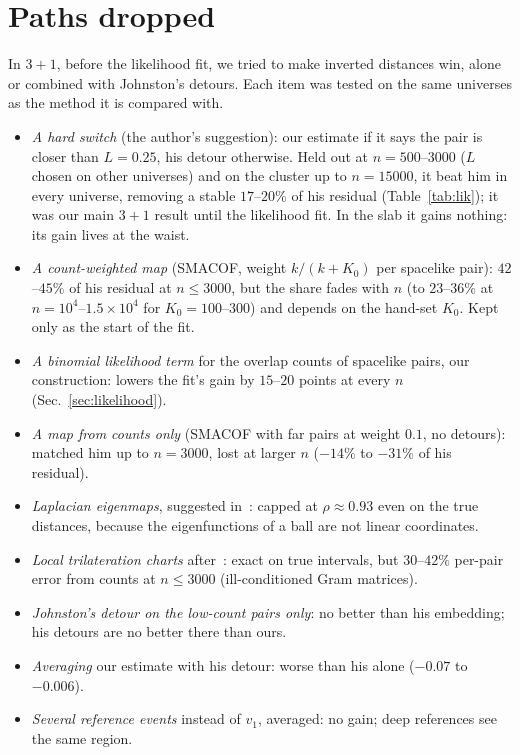 \documentclass[11pt,a4paper]{article}
\begin{document}
\section{Paths dropped}\label{app:dropped}
In $3+1$, before the likelihood fit, we tried to make inverted distances win, alone or combined with Johnston's detours. Each item was tested on the same universes as the method it is compared with.
\begin{itemize}[leftmargin=*,itemsep=1pt]
\item \emph{A hard switch} (the author's suggestion): our estimate if it says the pair is closer than $L=0.25$, his detour otherwise. Held out at $n=500$--$3000$ ($L$ chosen on other universes) and on the cluster up to $n=15000$, it beat him in every universe, removing a stable $17$--$20\%$ of his residual (Table~\ref{tab:lik}); it was our main $3+1$ result until the likelihood fit. In the slab it gains nothing: its gain lives at the waist.
\item \emph{A count-weighted map} (SMACOF, weight $k/(k+K_0)$ per spacelike pair): $42$--$45\%$ of his residual at $n\le3000$, but the share fades with $n$ (to $23$--$36\%$ at $n=10^4$--$1.5\times10^4$ for $K_0=100$--$300$) and depends on the hand-set $K_0$. Kept only as the start of the fit.
\item \emph{A binomial likelihood term} for the overlap counts of spacelike pairs, our construction: lowers the fit's gain by $15$--$20$ points at every $n$ (Sec.~\ref{sec:likelihood}).
\item \emph{A map from counts only} (SMACOF with far pairs at weight $0.1$, no detours): matched him up to $n=3000$, lost at larger $n$ ($-14\%$ to $-31\%$ of his residual).
\item \emph{Laplacian eigenmaps}, suggested in~\cite{BK24}: capped at $\rho\approx0.93$ even on the true distances, because the eigenfunctions of a ball are not linear coordinates.
\item \emph{Local trilateration charts} after~\cite{Madsen26}: exact on true intervals, but $30$--$42\%$ per-pair error from counts at $n\le3000$ (ill-conditioned Gram matrices).
\item \emph{Johnston's detour on the low-count pairs only}: no better than his embedding; his detours are no better there than ours.
\item \emph{Averaging} our estimate with his detour: worse than his alone ($-0.07$ to $-0.006$).
\item \emph{Several reference events} instead of $v_1$, averaged: no gain; deep references see the same region.

\end{itemize}
\end{document}
